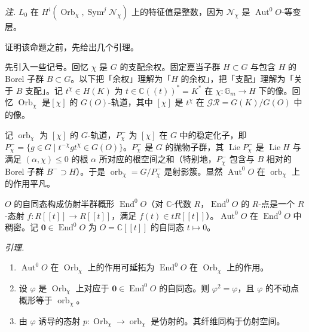 \emph{注.} $L_0$ 在 $H^{i}(\operatorname{Orb}_{\chi},\operatorname{Sym}^{j}\mathcal{N}_{\chi})$ 上的特征值是整数，因为 $\mathcal{N}_{\chi}$ 是 $\operatorname{Aut}^{0}O$-等变层。

证明该命题之前，先给出几个引理。

 先引入一些记号。回忆 $\chi$ 是 $G$ 的支配余权。固定嘉当子群 $H\subset G$ 与包含 $H$ 的 Borel 子群 $B\subset G$。以下把「余权」理解为「$H$ 的余权」，把「支配」理解为「关于 $B$ 支配」。记 $t^{\chi}\in H(K)$ 为 $t\in\mathbb{C}((t))^{*}=K^{*}$ 在 $\chi:\mathbb{G}_{m}\to H$ 下的像。回忆 $\operatorname{Orb}_{\chi}$ 是$[\chi]$ 的 $G(O)$-轨道，其中 $[\chi]$ 是 $t^{\chi}$ 在 $\mathcal{GR}=G(K)/G(O)$ 中的像。

记 $\operatorname{orb}_{\chi}$ 为 $[\chi]$ 的 $G$-轨道，$P^{-}_{\chi}$ 为 $[\chi]$ 在 $G$ 中的稳定化子，即 $P^{-}_{\chi}=\{g\in G\mid t^{-\chi}gt^{\chi}\in G(O)\}$。$P^{-}_{\chi}$ 是 $G$ 的抛物子群，其 $\operatorname{Lie}P^{-}_{\chi}$ 是 $\operatorname{Lie}H$ 与满足 $(\alpha,\chi)\le 0$ 的根 $\alpha$ 所对应的根空间之和（特别地，$P^{-}_{\chi}$ 包含与 $B$ 相对的 Borel 子群 $B^{-}\supset H$）。于是 $\operatorname{orb}_{\chi}=G/P^{-}_{\chi}$ 是射影簇。显然 $\operatorname{Aut}^{0}O$ 在 $\operatorname{orb}_{\chi}$ 上的作用平凡。

 $O$ 的自同态构成仿射半群概形 $\operatorname{End}^{0}O$（对 $\mathbb{C}$-代数 $R$，$\operatorname{End}^{0}O$ 的 $R$-点是一个 $R$-态射 $f:R[[t]]\to R[[t]]$，满足 $f(t)\in tR[[t]]$）。$\operatorname{Aut}^{0}O$ 在 $\operatorname{End}^{0}O$ 中稠密。记 $\mathbf{0}\in\operatorname{End}^{0}O$ 为 $O=\mathbb{C}[[t]]$ 的自同态 $t\mapsto 0$。

 \emph{引理.}
\begin{enumerate}[label=\roman*),leftmargin=2.2em]
\item $\operatorname{Aut}^{0}O$ 在 $\operatorname{Orb}_{\chi}$ 上的作用可延拓为 $\operatorname{End}^{0}O$ 在 $\operatorname{Orb}_{\chi}$ 上的作用。
\item 设 $\varphi$ 是 $\operatorname{Orb}_{\chi}$ 上对应于 $\mathbf{0}\in\operatorname{End}^{0}O$ 的自同态。则 $\varphi^{2}=\varphi$，且 $\varphi$ 的不动点概形等于 $\operatorname{orb}_{\chi}$。
\item 由 $\varphi$ 诱导的态射 $p:\operatorname{Orb}_{\chi}\to\operatorname{orb}_{\chi}$ 是仿射的。其纤维同构于仿射空间。
\end{enumerate}

